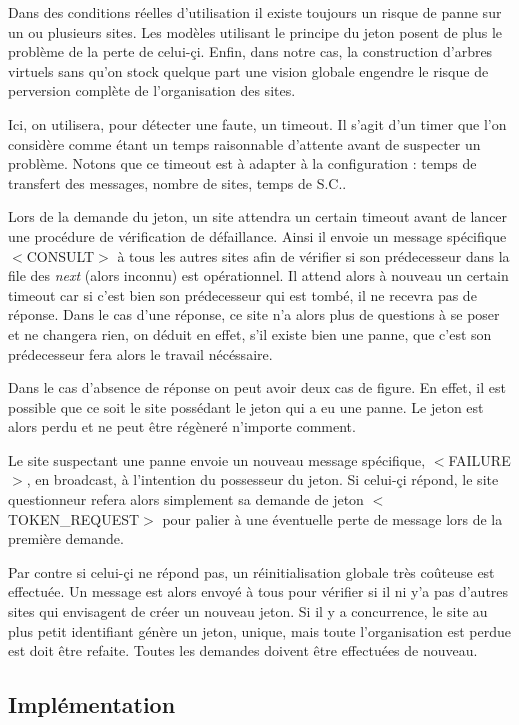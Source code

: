 \documentclass[a4paper,12pt]{report}
\newcommand{\next}{\textit{next} }
\begin{document}
Dans des conditions réelles d'utilisation il existe toujours un risque de panne sur un ou plusieurs sites. Les modèles utilisant le principe du jeton posent de plus le problème de la perte de celui-çi. Enfin, dans notre cas, la construction d'arbres virtuels sans qu'on stock quelque part une vision globale engendre le risque de perversion complète de l'organisation des sites.

Ici, on utilisera, pour détecter une faute, un timeout. Il s'agit d'un timer que l'on considère comme étant un temps raisonnable d'attente avant de suspecter un problème. Notons que ce timeout est à adapter à la configuration : temps de transfert des messages, nombre de sites, temps de S.C..

Lors de la demande du jeton, un site attendra un certain timeout avant de lancer une procédure de vérification de défaillance. Ainsi il envoie un message spécifique $<$CONSULT$>$ à tous les autres sites afin de vérifier si son prédecesseur dans la file des \next (alors inconnu) est opérationnel. Il attend alors à nouveau un certain timeout car si c'est bien son prédecesseur qui est tombé, il ne recevra pas de réponse.
Dans le cas d'une réponse, ce site n'a alors plus de questions à se poser et ne changera rien, on déduit en effet, s'il existe bien une panne, que c'est son prédecesseur fera alors le travail nécéssaire. 

Dans le cas d'absence de réponse on peut avoir deux cas de figure. En effet, il est possible que ce soit le site possédant le jeton qui a eu une panne. Le jeton est alors perdu et ne peut être régèneré n'importe comment.

Le site suspectant une panne envoie un nouveau message spécifique, $<$FAILURE$>$, en broadcast, à l'intention du possesseur du jeton. Si celui-çi répond, le site questionneur refera alors simplement sa demande de jeton $<$TOKEN\_REQUEST$>$ pour palier à une éventuelle perte de message lors de la première demande.

Par contre si celui-çi ne répond pas, un réinitialisation globale très coûteuse est effectuée. Un message est alors envoyé à tous pour vérifier si il ni y'a pas d'autres sites qui envisagent de créer un nouveau jeton. Si il y a concurrence, le site au plus petit identifiant génère un jeton, unique, mais toute l'organisation est perdue est doit être refaite. Toutes les demandes doivent être effectuées de nouveau.
 
\subsection*{Implémentation}
\end{document}
